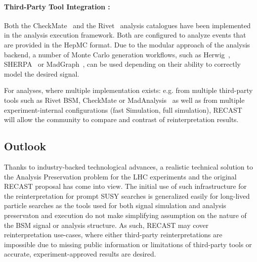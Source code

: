 \paragraph{Third-Party Tool Integration :}

Both the CheckMate~\cite{Drees:2013wra,Dercks:2016npn} and the Rivet~\cite{Buckley:2010ar} analysis catalogues have been implemented in the analysis execution framework. Both are configured to analyze events that are provided in the HepMC format. Due to the modular approach of the analysis backend, a number of Monte Carlo generation workflows, such as Herwig~\cite{Marchesini:1991ch}, SHERPA~\cite{Gleisberg:2008ta} or MadGraph~\cite{Alwall:2011uj}, can be used depending on their ability to correctly model the desired signal.

For analyses, where multiple implementation exists: e.g. from multiple third-party tools such as Rivet BSM, CheckMate or MadAnalysis~\cite{Conte:2014zja,Dumont:2014tja} as well as from multiple experiment-internal configurations (fast Simulation, full simulation), RECAST will allow the community to compare and contrast of reinterpretation results.

\subsection{Outlook}

Thanks to industry-backed technological advances, a realistic technical solution to the Analysis Preservation problem for the LHC experiments and the original RECAST proposal has come into view. The initial use of such infrastructure for the reinterpretation for prompt SUSY searches is generalized easily for long-lived particle searches as the tools used for both signal simulation and analysis preservaton and execution do not make simplifying assumption on the nature of the BSM signal or analysis structure.  As such, RECAST may cover reinterpretation use-cases, where either third-party reinterpretations are impossible due to missing public information or limitations of third-party tools or accurate, experiment-approved results are desired.
